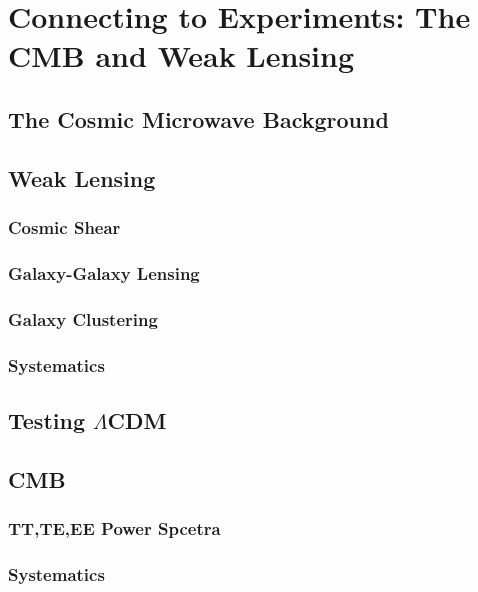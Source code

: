 \chapter{Connecting to Experiments: The CMB and Weak Lensing}
\section{The Cosmic Microwave Background}
\section{Weak Lensing}
\subsection{Cosmic Shear}
\subsection{Galaxy-Galaxy Lensing}
\subsection{Galaxy Clustering}
\subsection{Systematics}
\section{Testing $\Lambda$CDM}
\section{CMB}
\subsection{TT,TE,EE Power Spcetra}
\subsection{Systematics}
